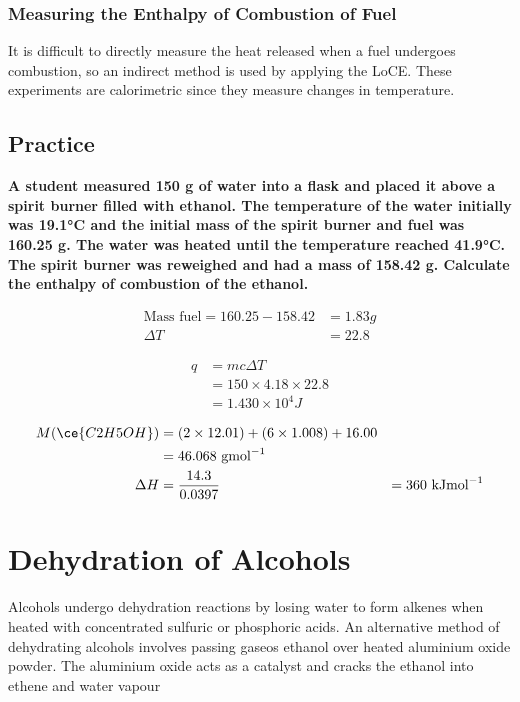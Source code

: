 		\subsubsection{Measuring the Enthalpy of Combustion of Fuel}
		
			It is difficult to directly measure the heat released when a fuel undergoes combustion, so an indirect method is used by applying the LoCE. These experiments are calorimetric since they measure changes in temperature.

	\subsection{Practice}
	
		\textbf{A student measured 150 g of water into a flask and placed it above a spirit burner filled with ethanol. The temperature of the water initially was 19.1°C and the initial mass of the spirit burner and fuel was 160.25 g. The water was heated until the temperature reached 41.9°C. The spirit burner was reweighed and had a mass of 158.42 g. Calculate the enthalpy of combustion of the ethanol.}
		
		\begin{align*}
			\text{Mass fuel} = 160.25 - 158.42 &= 1.83g \\
			\Delta T &= 22.8
		\end{align*}

		\begin{align*}
			q &= mc \Delta T \\
			&= 150 \times 4.18 \times 22.8 \\
			&= 1.430 \times 10^4 J
		\end{align*}

		\begin{align*}
			M(\ce{C2H5OH}) &= (2 \times 12.01) + (6 \times 1.008) + 16.00 \\
				       &= 46.068 \text{ gmol}^{-1} \\
			\Delta H &= \frac{14.3}{0.0397} &= 360 \text{ kJmol}^{-1}
		\end{align*}

\section{Dehydration of Alcohols} \label{21/05/2025}

	Alcohols undergo dehydration reactions by losing water to form alkenes when heated with concentrated sulfuric or phosphoric acids. An alternative method of dehydrating alcohols involves passing gaseos ethanol over heated aluminium oxide powder. The aluminium oxide acts as a catalyst and cracks the ethanol into ethene and water vapour

